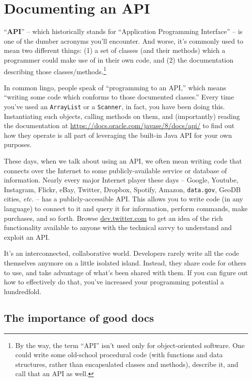 
\chapter{Documenting an API}
\label{ch:api}

``\textbf{API}'' -- which historically stands for ``Application Programming
Interface'' -- is one of the dumber acronyms you'll encounter. And worse, it's
commonly used to mean two different things: (1) a set of classes (and their
methods) which a programmer could make use of in their own code, and (2) the
documentation describing those classes/methods.\footnote{By the way, the term
``API'' isn't used only for object-oriented software. One could write some
old-school procedural code (with functions and data structures, rather than
encapsulated classes and methods), describe it, and call that an API as well.}

In common lingo, people speak of ``programming to an API,'' which means
``writing some code which conforms to those documented classes.'' Every
time you've used an \texttt{ArrayList} or a \texttt{Scanner}, in fact, you
have been doing this. Instantiating such objects, calling methods on them, and
(importantly) reading the documentation at
\url{https://docs.oracle.com/javase/8/docs/api/} to find out how they
operate is all part of leveraging the built-in Java API for your own purposes.

These days, when we talk about using an API, we often mean writing code that
connects over the Internet to some publicly-available service or database of
information. Nearly every major Internet player these days -- Google, Youtube,
Instagram, Flickr, eBay, Twitter, Dropbox, Spotify, Amazon, \texttt{data.gov},
GeoDB cities, \textit{etc.} -- has a publicly-accessible API. This allows you
to write code (in any language) to connect to it and query it for information,
perform commands, make purchases, and so forth. Browse \url{dev.twitter.com} to
get an idea of the rich functionality available to anyone with the technical
savvy to understand and exploit an API.

It's an interconnected, collaborative world. Developers rarely write all the
code themselves anymore on a little isolated island. Instead, they share code
for others to use, and take advantage of what's been shared with them. If you
can figure out how to effectively do that, you've increased your programming
potential a hundredfold.

\section{The importance of good docs}

